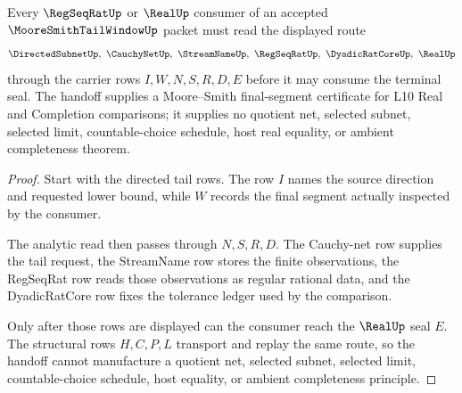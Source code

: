 \begin{theorem}
\label{thm:moore-smith-tail-window-regseqrat-real-handoff}
Every $\RegSeqRatUp$ or $\RealUp$ consumer of an accepted $\MooreSmithTailWindowUp$ packet must read the displayed route
$$
\DirectedSubnetUp,\ \CauchyNetUp,\ \StreamNameUp,\ \RegSeqRatUp,\ \DyadicRatCoreUp,\ \RealUp
$$
through the carrier rows $I,W,N,S,R,D,E$ before it may consume the terminal seal. The handoff supplies a Moore--Smith final-segment certificate for L10 Real and Completion comparisons; it supplies no quotient net, selected subnet, selected limit, countable-choice schedule, host real equality, or ambient completeness theorem.
\end{theorem}
\begin{proof}
Start with the directed tail rows. The row $I$ names the source direction and requested lower bound, while $W$ records the final segment actually inspected by the consumer.

The analytic read then passes through $N,S,R,D$. The Cauchy-net row supplies the tail request, the StreamName row stores the finite observations, the RegSeqRat row reads those observations as regular rational data, and the DyadicRatCore row fixes the tolerance ledger used by the comparison.

Only after those rows are displayed can the consumer reach the $\RealUp$ seal $E$. The structural rows $H,C,P,L$ transport and replay the same route, so the handoff cannot manufacture a quotient net, selected subnet, selected limit, countable-choice schedule, host equality, or ambient completeness principle.
\end{proof}



